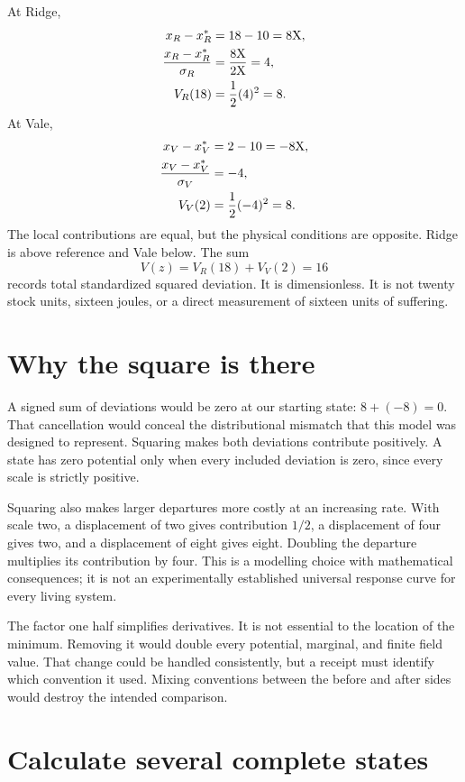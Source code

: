 At Ridge,
\begin{align}
x_R-x_R^*&=18-10=8\mathrm{X},\\
\frac{x_R-x_R^*}{\sigma_R}&=\frac{8\mathrm{X}}{2\mathrm{X}}=4,\\
V_R(18)&=\frac12(4)^2=8.
\end{align}
At Vale,
\begin{align}
x_V-x_V^*&=2-10=-8\mathrm{X},\\
\frac{x_V-x_V^*}{\sigma_V}&=-4,\\
V_V(2)&=\frac12(-4)^2=8.
\end{align}
The local contributions are equal, but the physical conditions are opposite. Ridge is above reference and Vale below. The sum
\begin{equation}
V(z)=V_R(18)+V_V(2)=16
\end{equation}
records total standardized squared deviation. It is dimensionless. It is not twenty stock units, sixteen joules, or a direct measurement of sixteen units of suffering.

\section{Why the square is there}

A signed sum of deviations would be zero at our starting state: \(8+(-8)=0\). That cancellation would conceal the distributional mismatch that this model was designed to represent. Squaring makes both deviations contribute positively. A state has zero potential only when every included deviation is zero, since every scale is strictly positive.

Squaring also makes larger departures more costly at an increasing rate. With scale two, a displacement of two gives contribution \(1/2\), a displacement of four gives two, and a displacement of eight gives eight. Doubling the departure multiplies its contribution by four. This is a modelling choice with mathematical consequences; it is not an experimentally established universal response curve for every living system.

The factor one half simplifies derivatives. It is not essential to the location of the minimum. Removing it would double every potential, marginal, and finite field value. That change could be handled consistently, but a receipt must identify which convention it used. Mixing conventions between the before and after sides would destroy the intended comparison.

\section{Calculate several complete states}

